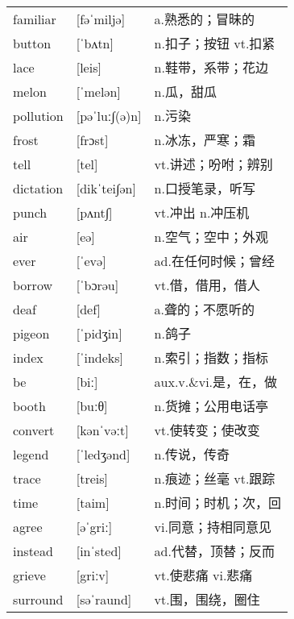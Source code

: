 \documentclass[a4paper]{article}
\begin{document}
\section{}
\begin{tabular}{l l l}

familiar & [fəˈmiljə] & a.熟悉的；冒昧的 \\
button & [ˈbʌtn] & n.扣子；按钮 vt.扣紧 \\
lace & [leis] & n.鞋带，系带；花边 \\
melon & [ˈmelən] & n.瓜，甜瓜 \\
pollution & [pəˈluː∫(ə)n] & n.污染 \\
frost & [frɔst] & n.冰冻，严寒；霜 \\
tell & [tel] & vt.讲述；吩咐；辨别 \\
dictation & [dikˈtei∫ən] & n.口授笔录，听写 \\
punch & [pʌnt∫] & vt.冲出 n.冲压机 \\
air & [eə] & n.空气；空中；外观 \\
ever & [ˈevə] & ad.在任何时候；曾经 \\
borrow & [ˈbɔrəu] & vt.借，借用，借人 \\
deaf & [def] & a.聋的；不愿听的 \\
pigeon & [ˈpidʒin] & n.鸽子 \\
index & [ˈindeks] & n.索引；指数；指标 \\
be & [biː] & aux.v.\&vi.是，在，做 \\
booth & [buːθ] & n.货摊；公用电话亭 \\
convert & [kənˈvəːt] & vt.使转变；使改变 \\
legend & [ˈledʒənd] & n.传说，传奇 \\
trace & [treis] & n.痕迹；丝毫 vt.跟踪 \\
time & [taim] & n.时间；时机；次，回 \\
agree & [əˈgriː] & vi.同意；持相同意见 \\
instead & [inˈsted] & ad.代替，顶替；反而 \\
grieve & [griːv] & vt.使悲痛 vi.悲痛 \\
surround & [səˈraund] & vt.围，围绕，圈住 \\

\end{tabular}
\end{document}
